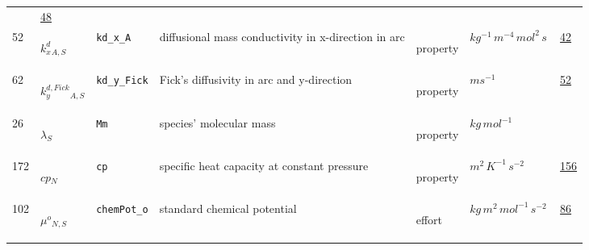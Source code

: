 \begin{longtable}{|p{1cm}|p{2.5cm}|p{4.5cm}|p{8cm}|p{3.0cm}|p{3cm}|p{1cm}|}
             &                 \hyperlink{"e:48"}{ 48 }
                 \\
            52
             & \hypertarget{"v:52"}{ $ {{k^d_x}}{_{A, S}} $}
             & \verb|kd_x_A|
             & diffusional mass conductivity in x-direction in arc
             & \begin{lay}property \end{lay}
             & $ kg^{-1} \,m^{-4} \,mol^{2} \,s \, $
             &                 \hyperlink{"e:42"}{ 42 }
                 \\
            62
             & \hypertarget{"v:62"}{ $ {{k^{d,Fick}_y}}{_{A, S}} $}
             & \verb|kd_y_Fick|
             & Fick's diffusivity in arc and y-direction 
             & \begin{lay}property \end{lay}
             & $ m s^{-1} \, $
             &                 \hyperlink{"e:52"}{ 52 }
                 \\
            26
             & \hypertarget{"v:26"}{ $ {{\lambda}}{_{S}} $}
             & \verb|Mm|
             & species' molecular mass
             & \begin{lay}property \end{lay}
             & $ kg \,mol^{-1} \, $
             & \\
            172
             & \hypertarget{"v:172"}{ $ {cp}{_{N}} $}
             & \verb|cp|
             & specific heat capacity at constant pressure
             & \begin{lay}property \end{lay}
             & $ m^{2} \,K^{-1} \,s^{-2} \, $
             &                 \hyperlink{"e:156"}{ 156 }
                 \\
            102
             & \hypertarget{"v:102"}{ $ {{\mu^o}}{_{N, S}} $}
             & \verb|chemPot_o|
             & standard chemical potential
             & \begin{lay}effort \end{lay}
             & $ kg \,m^{2} \,mol^{-1} \,s^{-2} \, $
             &                 \hyperlink{"e:86"}{ 86 }
                 \\
    \end{longtable}